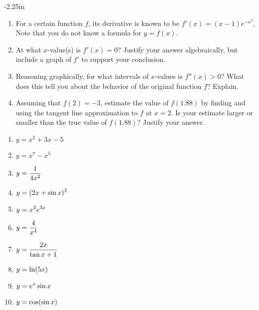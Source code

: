 \begin{adjustwidth*}{}{-2.25in}
\begin{multicols*}{2}
\begin{enumerate}[1),resume]
\item For a certain function $f$, its derivative is known to be $f'(x) = (x-1)e^{-x^2}$.  Note that you do not know a formula for $y = f(x)$.
\ba  
  	\item At what $x$-value(s) is $f'(x) = 0$?  Justify your answer algebraically, but include a graph of $f'$ to support your conclusion.
	\item Reasoning graphically, for what intervals of $x$-values is $f''(x) > 0$?  What does this tell you about the  behavior of the original function $f$?  Explain.
	\item Assuming that $f(2) = -3$, estimate the value of $f(1.88)$ by finding and using the tangent line approximation to $f$ at $x=2$.  Is your estimate larger or smaller than the true value of $f(1.88)$?  Justify your answer.
\ea
\end{enumerate}


\begin{enumerate}[1),resume]
\item $y=x^2+3x-5$
\item $y=x^7-x^5$
\item $\displaystyle y=\frac{1}{4x^2}$
\item $\displaystyle y=(2x+\sin x)^2$
\item $\displaystyle y=x^2e^{3x}$
\item $\displaystyle y=\frac{4}{x^4}$
\item $\displaystyle y=\frac{2x}{\tan x + 1}$
\item $\displaystyle y=\ln (5x)$
\item $\displaystyle y=e^x\sin x$
\item $\displaystyle y=\cos (\sin x)$
\end{enumerate}

\end{multicols*}
\end{adjustwidth*}

\clearpage

